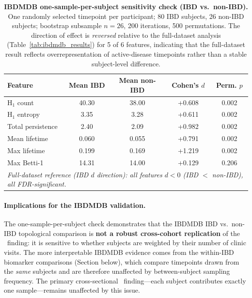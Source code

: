 \begin{table}[H]
\centering
\caption{%
  \textbf{IBDMDB one-sample-per-subject sensitivity check (IBD vs.\ non-IBD).}
  One randomly selected timepoint per participant; 80 IBD subjects,
  26 non-IBD subjects; bootstrap subsample $n = 26$, 200 iterations,
  500 permutations.
  The direction of effect is \emph{reversed} relative to the full-dataset
  analysis (Table~\ref{tab:ibdmdb_results}) for 5 of 6 features,
  indicating that the full-dataset result reflects overrepresentation
  of active-disease timepoints rather than a stable subject-level difference.
}
\label{tab:ibdmdb_1ps}
\small
\setlength{\tabcolsep}{7pt}
\begin{tabular}{lcccc}
\toprule
\textbf{Feature} & \textbf{Mean IBD} & \textbf{Mean non-IBD} & \textbf{Cohen's $d$} & \textbf{Perm. $p$} \\
\midrule
H$_1$ count                 & 40.30 & 38.00 & +0.608 & 0.002 \\
H$_1$ entropy               &  3.35 &  3.28 & +0.611 & 0.002 \\
Total persistence           &  2.40 &  2.09 & +0.982 & 0.002 \\
Mean lifetime               & 0.060 & 0.055 & +0.791 & 0.002 \\
Max lifetime                & 0.199 & 0.169 & +1.219 & 0.002 \\
Max Betti-1                 & 14.31 & 14.00 & +0.129 & 0.206 \\
\midrule
\multicolumn{5}{l}{\textit{Full-dataset reference (IBD $d$ direction):
  all features $d < 0$ (IBD $<$ non-IBD), all FDR-significant.}} \\
\bottomrule
\end{tabular}
\end{table}

\paragraph{Implications for the IBDMDB validation.}
The one-sample-per-subject check demonstrates that the IBDMDB IBD vs.\
non-IBD topological comparison is \textbf{not a robust cross-cohort
replication} of the \agp\ finding: it is sensitive to whether subjects
are weighted by their number of clinic visits.
The more interpretable IBDMDB evidence comes from the within-IBD biomarker
comparisons (Section below), which compare timepoints drawn from the
\emph{same} subjects and are therefore unaffected by between-subject sampling
frequency.
The primary cross-sectional \agp\ finding---each subject contributes exactly
one sample---remains unaffected by this issue.

